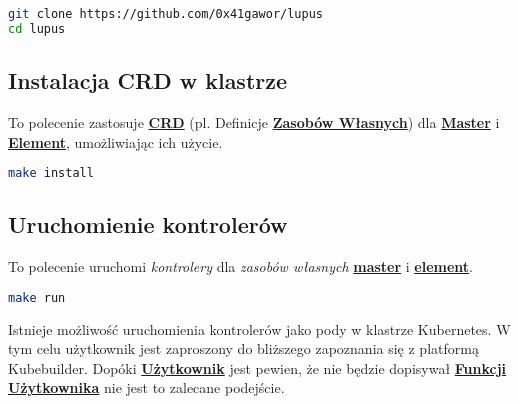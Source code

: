 \begin{lstlisting}[language=bash, caption={Klonowanie repozytorium}]
git clone https://github.com/0x41gawor/lupus
cd lupus
\end{lstlisting}

\subsection{Instalacja CRD w klastrze}

To polecenie zastosuje \hyperlink{def:crd}{\textbf{CRD}} (pl. Definicje \hyperlink{def:zasoby-wlasne}{\textbf{Zasobów Własnych}}) dla \hyperlink{def:master}{\textbf{Master}} i \hyperlink{def:element}{\textbf{Element}}, umożliwiając ich użycie.

\begin{lstlisting}[language=bash, caption={Instalacja CRD}]
make install
\end{lstlisting}

\subsection{Uruchomienie kontrolerów }

To polecenie uruchomi \textit{kontrolery} dla \textit{zasobów własnych} \hyperlink{def:master}{\textbf{master}} i \hyperlink{def:element}{\textbf{element}}.

\begin{lstlisting}[language=bash, caption={Uruchomienie kontrolerów}]
make run
\end{lstlisting}

Istnieje możliwość uruchomienia kontrolerów jako pody w klastrze Kubernetes. W tym celu użytkownik jest zaproszony do bliższego zapoznania się z platformą Kubebuilder. Dopóki \hyperlink{def:uzytkownik}{\textbf{Użytkownik}} jest pewien, że nie będzie dopisywał \hyperlink{def:funkcje-uzytkownika}{\textbf{Funkcji Użytkownika}} nie jest to zalecane podejście. 



